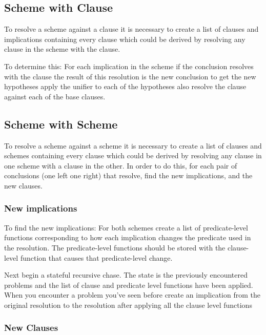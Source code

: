 \documentclass{article}
\begin{document}
\subsection{Scheme with Clause}

To resolve a scheme against a clause it is necessary to create a list of clauses and implications containing every
clause which could be derived by resolving any clause in the scheme with the clause. 

To determine this:
For each implication in the scheme if the conclusion resolves with the clause 
  the result of this resolution is the new conclusion
  to get the new hypotheses apply the unifier to each of the hypotheses
  also resolve the clause against each of the base clauses.

\subsection{Scheme with Scheme}


    To resolve a scheme against a scheme it is necessary to create a list of clauses and schemes containing every clause which could be derived by resolving any clause in one scheme with a clause in the other.
    In order to do this, for each pair of conclusions (one left one right) that resolve, find the new implications, and the new clauses.

\subsubsection{New implications}
  
  To find the new implications: For both schemes create a list of predicate-level functions corresponding to how each implication changes the predicate
  used in the resolution.
  The predicate-level functions should be stored with the clause-level function that causes that predicate-level change.

  Next begin a stateful recursive chase.
    The state is the previously encountered problems and the list of clause and predicate level functions have been applied.
    When you encounter a problem you've seen before create an implication
    from the original resolution to the resolution after applying all the clause level functions

\subsubsection{New Clauses}
\end{document}
